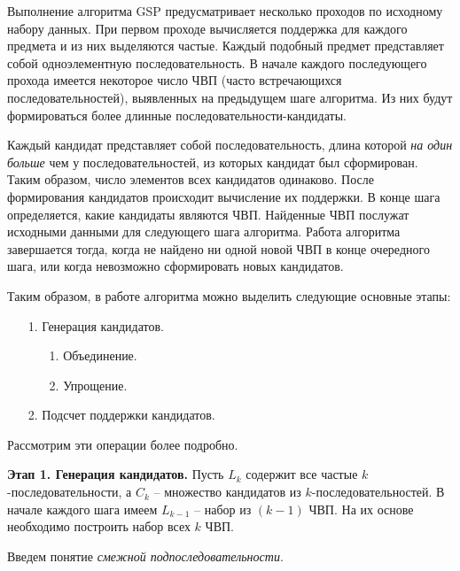 Выполнение алгоритма GSP предусматривает несколько проходов по исходному набору данных. При первом проходе вычисляется поддержка для каждого предмета и из них выделяются частые. Каждый подобный предмет представляет собой одноэлементную последовательность. В начале каждого последующего прохода имеется некоторое число ЧВП (часто встречающихся последовательностей), выявленных на предыдущем шаге алгоритма. Из них будут формироваться более длинные последовательности-кандидаты.

Каждый кандидат представляет собой последовательность, длина которой \textit{на один больше} чем у последовательностей, из которых кандидат был сформирован. Таким образом, число элементов всех кандидатов одинаково. После формирования кандидатов происходит вычисление их поддержки. В конце шага определяется, какие кандидаты являются ЧВП. Найденные ЧВП послужат исходными данными для следующего шага алгоритма. Работа алгоритма завершается тогда, когда не найдено ни одной новой ЧВП в конце очередного шага, или когда невозможно сформировать новых кандидатов.

Таким образом, в работе алгоритма можно выделить следующие основные этапы:


\begin{enumerate}
	\item[1.] Генерация кандидатов.
	\begin{enumerate}
		\item[1.] Объединение.
		\item[2.] Упрощение.
	\end{enumerate}
	\item[2.] Подсчет поддержки кандидатов.
\end{enumerate}

Рассмотрим эти операции более подробно.

\textbf{Этап 1. Генерация кандидатов.} Пусть $L_k$ содержит все частые $k$-последовательности, а $C_k$ – множество кандидатов из $k$-последовательностей. В начале каждого шага имеем $L_{k-1}$ – набор из $(k-1)$ ЧВП. На их основе необходимо построить набор всех $k$ ЧВП.

Введем понятие \textit{смежной подпоследовательности}.

